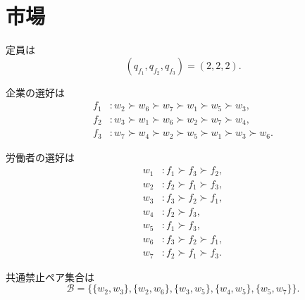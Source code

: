 \documentclass[a4paper,11pt]{ltjsarticle}
\begin{document}
\section*{市場}

定員は
\[
  (q_{f_1}, q_{f_2}, q_{f_3}) = (2, 2, 2).
\]

企業の選好は
\begin{align*}
  f_1 &: w_2 \succ w_6 \succ w_7 \succ w_1 \succ w_5 \succ w_3, \\
  f_2 &: w_3 \succ w_1 \succ w_6 \succ w_2 \succ w_7 \succ w_4, \\
  f_3 &: w_7 \succ w_4 \succ w_2 \succ w_5 \succ w_1 \succ w_3 \succ w_6.
\end{align*}

労働者の選好は
\begin{align*}
  w_1 &: f_1 \succ f_3 \succ f_2, \\
  w_2 &: f_2 \succ f_1 \succ f_3, \\
  w_3 &: f_3 \succ f_2 \succ f_1, \\
  w_4 &: f_2 \succ f_3, \\
  w_5 &: f_1 \succ f_3, \\
  w_6 &: f_3 \succ f_2 \succ f_1, \\
  w_7 &: f_2 \succ f_1 \succ f_3.
\end{align*}

共通禁止ペア集合は
\[
  \mathcal{B} = \bigl\{ \{w_2, w_3\}, \{w_2, w_6\}, \{w_3, w_5\}, \{w_4, w_5\}, \{w_5, w_7\} \bigr\}.
\]
\end{document}
